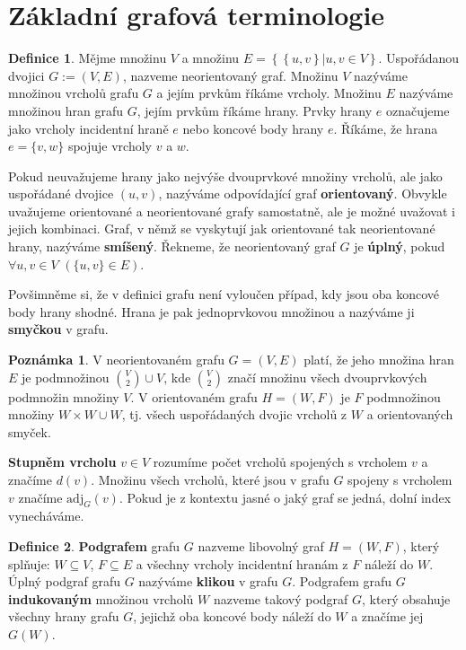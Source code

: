 \documentclass[11pt,american,czech,oneside]{book}
\theoremstyle{plain}
\theoremstyle{definition}
\newtheorem{definition}{Definice}
\newtheorem{remark}{Poznámka}
\begin{document}
\section{Základní grafová terminologie}

\begin{definition}
  Mějme množinu $V$ a množinu $E = \left\{ \left\{ u,v \right\} | u,v \in V \right\}$. Uspořádanou dvojici $G := (V,E)$, nazveme neorientovaný graf. Množinu $V$ nazýváme množinou vrcholů grafu $G$ a jejím prvkům říkáme vrcholy. Množinu $E$ nazýváme množinou hran grafu $G$, jejím prvkům říkáme hrany. Prvky hrany $e$ označujeme jako vrcholy incidentní hraně $e$ nebo koncové body hrany $e$. Říkáme, že hrana $e = \{v,w\}$ spojuje vrcholy $v$ a $w$.
\end{definition}

Pokud neuvažujeme hrany jako nejvýše dvouprvkové množiny vrcholů, ale  jako uspořádané dvojice $(u,v)$, nazýváme odpovídající graf \textbf{orientovaný}. Obvykle uvažujeme orientované a neorientované grafy samostatně, ale je možné uvažovat i jejich kombinaci. Graf, v němž se vyskytují jak orientované tak neorientované hrany, nazýváme \textbf{smíšený}. Řekneme, že neorientovaný graf $G$ je \textbf{úplný}, pokud $\forall u, v \in V$ $\left(\{u,v\} \in E\right)$.

Povšimněme si, že v definici grafu není vyloučen případ, kdy jsou oba koncové body hrany shodné. Hrana je pak jednoprvkovou množinou a nazýváme ji \textbf{smyčkou} v grafu.

\begin{remark}
  V neorientovaném grafu $G=(V,E)$ platí, že jeho množina hran $E$ je podmnožinou ${V \choose 2} \cup V$, kde $V \choose 2$ značí množinu všech dvouprvkových podmnožin množiny $V$. V orientovaném grafu $H=(W,F)$ je $F$ podmnožinou množiny $W \times W \cup W$, tj. všech uspořádaných dvojic vrcholů z $W$ a orientovaných smyček.
\end{remark}

\textbf{Stupněm vrcholu} $v \in V$ rozumíme počet vrcholů spojených s vrcholem $v$ a značíme $d(v)$. Množinu všech vrcholů, které jsou v grafu $G$ spojeny s vrcholem $v$ značíme $\mathrm{adj}_G(v)$. Pokud je z kontextu jasné o jaký graf se jedná, dolní index vynecháváme.

\begin{definition}
  \textbf{Podgrafem} grafu $G$ nazveme libovolný graf $H=(W,F)$, který splňuje: $W\subseteq V$, $F\subseteq E$ a všechny vrcholy incidentní hranám z $F$ náleží do $W$. Úplný podgraf grafu $G$ nazýváme \textbf{klikou} v grafu $G$. Podgrafem grafu $G$ \textbf{indukovaným} množinou vrcholů $W$ nazveme takový podgraf $G$, který obsahuje všechny hrany grafu $G$, jejichž oba koncové body náleží do $W$ a značíme jej $G(W)$.
\end{definition}
\end{document}
